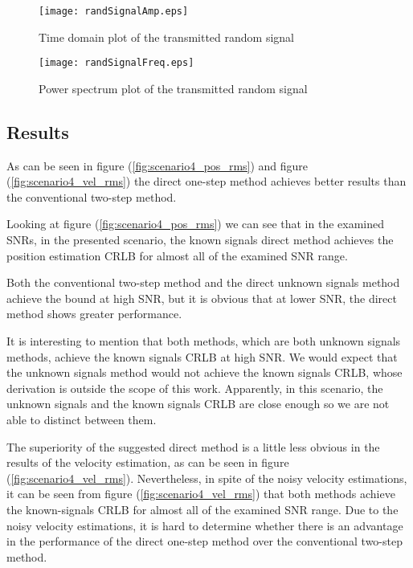 \begin{figure}
\begin{center}
\texttt{[image: randSignalAmp.eps]} 
\end{center}
\caption{Time domain plot of the transmitted random signal}
\label{fig:randSignalAmp}
\end{figure}

\begin{figure}
\begin{center}
\texttt{[image: randSignalFreq.eps]} 
\end{center}
\caption{Power spectrum plot of the transmitted random signal}
\label{fig:randSignalFreq}
\end{figure}

\subsection*{Results}
As can be seen in figure (\ref{fig:scenario4_pos_rms}) and figure (\ref{fig:scenario4_vel_rms}) the direct one-step method achieves better results than the conventional two-step method.

Looking at figure (\ref{fig:scenario4_pos_rms}) we can see that in the examined SNRs, in the presented scenario, the known signals direct method achieves the position estimation CRLB for almost all of the examined SNR range.

Both the conventional two-step method and the direct unknown signals method achieve the bound at high SNR, but it is obvious that at lower SNR, the direct method shows greater performance.

It is interesting to mention that both methods, which are both unknown signals methods, achieve the known signals CRLB at high SNR. We would expect that the unknown signals method would not achieve the known signals CRLB, whose derivation is outside the scope of this work. Apparently, in this scenario, the unknown signals and the known signals CRLB are close enough so we are not able to distinct between them.

The superiority of the suggested direct method is a little less obvious in the results of the velocity estimation, as can be seen in figure (\ref{fig:scenario4_vel_rms}). Nevertheless, in spite of the noisy velocity estimations, it can be seen from figure (\ref{fig:scenario4_vel_rms}) that both methods achieve the known-signals CRLB for almost all of the examined SNR range. Due to the noisy velocity estimations, it is hard to determine whether there is an advantage in the performance of the direct one-step method over the conventional two-step method.

